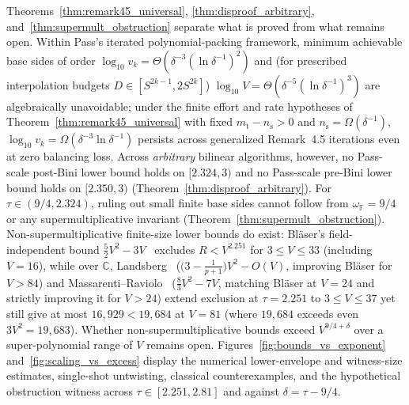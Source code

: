\documentclass[11pt,a4paper]{article}
\theoremstyle{plain}
\theoremstyle{definition}
\theoremstyle{remark}
\newcommand{\C}{\mathbb{C}}
\newcommand{\F}{\mathbb{F}}
\begin{document}
Theorems~\ref{thm:remark45_universal}, \ref{thm:disproof_arbitrary}, and~\ref{thm:supermult_obstruction} separate what is proved from what remains open. Within Pass's iterated polynomial-packing framework, minimum achievable base sides of order $\log_{10} v_k = \Theta(\delta^{-3}(\ln\delta^{-1})^2)$ and (for prescribed interpolation budgets $D \in [S^{2k-1}, 2 S^{2k}]$) $\log_{10} V = \Theta(\delta^{-5}(\ln\delta^{-1})^3)$ are algebraically unavoidable; under the finite effort and rate hypotheses of Theorem~\ref{thm:remark45_universal} with fixed $m_{\mathrm{t}} - n_{\mathrm{s}} > 0$ and $n_{\mathrm{s}} = \Omega(\delta^{-1})$, $\log_{10} v_k = \Omega(\delta^{-3}\ln\delta^{-1})$ persists across generalized Remark~4.5 iterations even at zero balancing loss. Across \emph{arbitrary} bilinear algorithms, however, no Pass-scale post-Bini lower bound holds on $[2.324, 3)$ and no Pass-scale pre-Bini lower bound holds on $[2.350, 3)$ (Theorem~\ref{thm:disproof_arbitrary}). For $\tau \in (9/4, 2.324)$, ruling out small finite base sides cannot follow from $\omega_{\F} = 9/4$ or any supermultiplicative invariant (Theorem~\ref{thm:supermult_obstruction}). Non-supermultiplicative finite-size lower bounds do exist: Bl\"aser's field-independent bound $\frac{5}{2}V^2 - 3V$~\cite{Blaser1999} excludes $R < V^{2.251}$ for $3 \le V \le 33$ (including $V = 16$), while over $\C$, Landsberg~\cite{Landsberg2014} ($\bigl(3 - \frac{1}{p+1}\bigr)V^2 - O(V)$, improving Bl\"aser for $V > 84$) and Massarenti--Raviolo~\cite{MassarentiRaviolo2013,MassarentiRaviolo2014} ($\frac{8}{3}V^2 - 7V$, matching Bl\"aser at $V = 24$ and strictly improving it for $V > 24$) extend exclusion at $\tau = 2.251$ to $3 \le V \le 37$ yet still give at most $16{,}929 < 19{,}684$ at $V = 81$ (where $19{,}684$ exceeds even $3 V^2 = 19{,}683$). Whether non-supermultiplicative bounds exceed $V^{9/4+\delta}$ over a super-polynomial range of $V$ remains open. Figures~\ref{fig:bounds_vs_exponent} and~\ref{fig:scaling_vs_excess} display the numerical lower-envelope and witness-size estimates, single-shot untwisting, classical counterexamples, and the hypothetical obstruction witness across $\tau \in [2.251, 2.81]$ and against $\delta = \tau - 9/4$.
\end{document}
